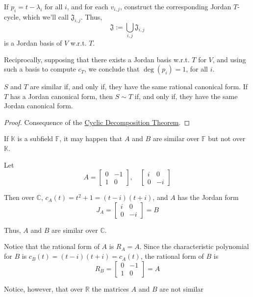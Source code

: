 If $p_i = t - \lambda_i$ for all $i$, and for each $v_{i,j}$, construct the corresponding Jordan $T$-cycle, which we'll call $\mathfrak{J}_{i,j}$. Thus, \[ \mathfrak{J} := \bigcup_{i,j} \mathfrak{J}_{i,j} \] is a Jordan basis of $V$ w.r.t. $T$.

Reciprocally, supposing that there exists a Jordan basis w.r.t. $T$ for $V$, and using such a basis to compute $c_T$, we conclude that $\deg(p_i) = 1$, for all $i$.

\begin{theorem}
  $S$ and $T$ are similar if, and only if, they have the same rational canonical form. If $T$ has a Jordan canonical form, then $S \sim T$ if, and only if, they have the same Jordan canonical form. 
\end{theorem}

\begin{proof}
  Consequence of the \hyperref[thm:CDT]{Cyclic Decomposition Theorem}.
\end{proof}

If $\mathbb{K}$ is a subfield $\mathbb{F}$, it may happen that $A$ and $B$ are similar over $\mathbb{F}$ but not over $\mathbb{K}$.

\begin{example}
  Let 
  \[
    A = \begin{bmatrix}
      0 & -1 \\
      1 & 0 
      \end{bmatrix}, \quad \begin{bmatrix}
      i & 0 \\
      0 & -i 
    \end{bmatrix}
  \]
  
  Then over $\mathbb{C}$, $c_A(t) = t^2 + 1 = (t-i)(t+i)$, and $A$ has the Jordan form 
  \[
    J_A = \begin{bmatrix} 
      i & 0 \\
      0 & -i 
    \end{bmatrix} = B
  \]

  Thus, $A$ and $B$ are similar over $\mathbb{C}$.

  Notice that the rational form of $A$ is $R_A = A$. Since the characteristic polynomial for $B$ is $c_B(t) = (t-i)(t+i) = c_A(t)$, the rational form of $B$ is 
  \[
    R_B = \begin{bmatrix}
      0 & -1 \\
      1 & 0 
    \end{bmatrix} = A
  \]

  Notice, however, that over $\mathbb{R}$ the matrices $A$ and $B$ are not similar
\end{example}
